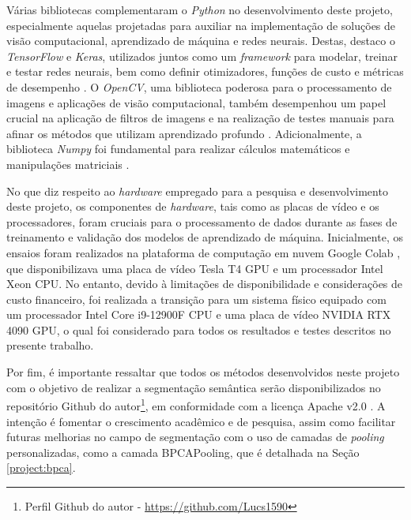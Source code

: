 Várias bibliotecas complementaram o \textit{Python} no desenvolvimento deste projeto, especialmente aquelas projetadas para auxiliar na implementação de soluções de visão computacional, aprendizado de máquina e redes neurais. Destas, destaco o \textit{TensorFlow} e \textit{Keras}, utilizados juntos como um \textit{framework} para modelar, treinar e testar redes neurais, bem como definir otimizadores, funções de custo e métricas de desempenho \citep{Geron2017Hands-onSystems, Chollet2021DeepPython}. O \textit{OpenCV}, uma biblioteca poderosa para o processamento de imagens e aplicações de visão computacional, também desempenhou um papel crucial na aplicação de filtros de imagens e na realização de testes manuais para afinar os métodos que utilizam aprendizado profundo \citep{Bradski2000TheLibrary.}. Adicionalmente, a biblioteca \textit{Numpy} foi fundamental para realizar cálculos matemáticos e manipulações matriciais \citep{Oliphant2007PythonComputing, VanDerWalt2011TheComputation}.

No que diz respeito ao \textit{hardware} empregado para a pesquisa e desenvolvimento deste projeto, os componentes de \textit{hardware}, tais como as placas de vídeo e os processadores, foram cruciais para o processamento de dados durante as fases de treinamento e validação dos modelos de aprendizado de máquina. Inicialmente, os ensaios foram realizados na plataforma de computação em nuvem Google Colab \citep{Bisong2019GoogleColaboratory}, que disponibilizava uma placa de vídeo Tesla T4 GPU e um processador Intel Xeon CPU. No entanto, devido à limitações de disponibilidade e considerações de custo financeiro, foi realizada a transição para um sistema físico equipado com um processador Intel Core i9-12900F CPU e uma placa de vídeo NVIDIA RTX 4090 GPU, o qual foi considerado para todos os resultados e testes descritos no presente trabalho.

Por fim, é importante ressaltar que todos os métodos desenvolvidos neste projeto com o objetivo de realizar a segmentação semântica serão disponibilizados no repositório Github do autor\footnote{Perfil Github do autor - \url{https://github.com/Lucs1590}}, em conformidade com a licença Apache v2.0 \citep{Licenses}. A intenção é fomentar o crescimento acadêmico e de pesquisa, assim como facilitar futuras melhorias no campo de segmentação com o uso de camadas de \textit{pooling} personalizadas, como a camada BPCAPooling, que é detalhada na Seção \ref{project:bpca}.


